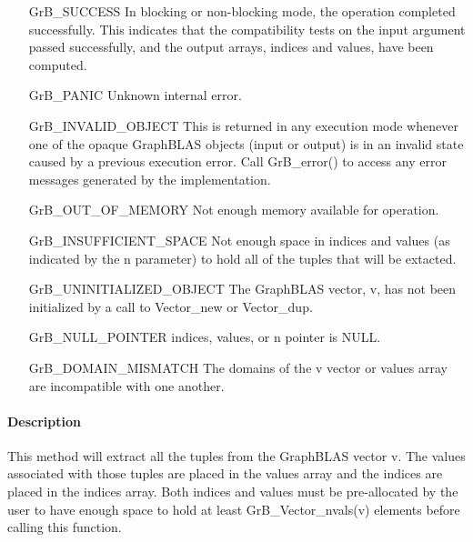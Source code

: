 \begin{itemize}[leftmargin=2.1in]
    \item[{\sf GrB\_SUCCESS}]  In blocking or non-blocking mode, the operation 
    completed successfully. This indicates that the compatibility tests on 
    the input argument passed successfully, and the output arrays, {\sf indices}
    and {\sf values}, have been computed.

    \item[{\sf GrB\_PANIC}]   Unknown internal error.
    
    \item[{\sf GrB\_INVALID\_OBJECT}] This is returned in any execution mode 
    whenever one of the opaque GraphBLAS objects (input or output) is in an invalid 
    state caused by a previous execution error.  Call {\sf GrB\_error()} to access 
    any error messages generated by the implementation.

    \item[{\sf GrB\_OUT\_OF\_MEMORY}]  Not enough memory available for operation.

    \item[{\sf GrB\_INSUFFICIENT\_SPACE}]  Not enough space in {\sf indices} and 
    {\sf values} (as indicated by the {\sf n} parameter) to hold all of the 
    tuples that will be extacted.
    
    \item[{\sf GrB\_UNINITIALIZED\_OBJECT}]  The GraphBLAS vector, {\sf v}, has 
    not been initialized by a call to {\sf Vector\_new} or {\sf Vector\_dup}.
    
    \item[{\sf GrB\_NULL\_POINTER}] {\sf indices}, {\sf values}, or {\sf n}
    pointer is {\sf NULL}.
     
    \item[{\sf GrB\_DOMAIN\_MISMATCH}] The domains of the {\sf v} vector or 
    {\sf values} array are incompatible with one another.
\end{itemize}


\paragraph{Description}


This method will extract all the tuples from the GraphBLAS vector {\sf v}.  
The values associated with those tuples are placed in the
{\sf values} array and the indices are placed in the {\sf indices} array. 
Both {\sf indices} and {\sf values} must be pre-allocated by the user to have enough
space to hold at least {\sf GrB\_Vector\_nvals(v)} elements before calling
this function. 

